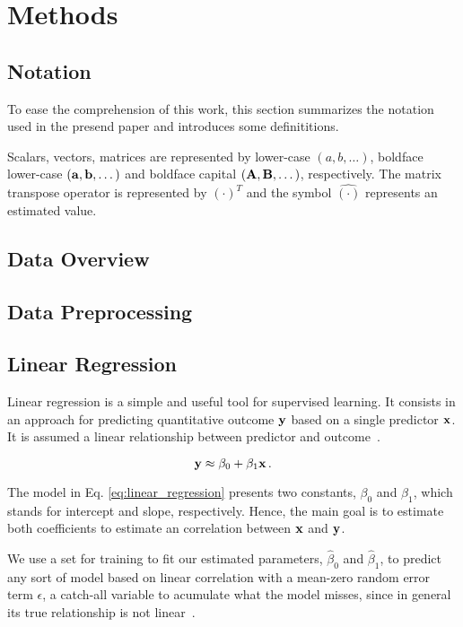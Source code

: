 \section{Methods}

\subsection{Notation}
To ease the comprehension of this work, this section summarizes the notation used in the presend paper and introduces some definititions.

Scalars, vectors, matrices are represented by lower-case $(a, b, \dots)$, boldface lower-case $({\bf a}, {\bf b}, \dots)$ and boldface capital $({\bf A}, {\bf B}, \dots)$, respectively. The matrix transpose operator is represented by $(\cdot)^T$ and the symbol $\hat{(\cdot)}$ represents an estimated value.

\subsection{Data Overview}

\subsection{Data Preprocessing}




\subsection{Linear Regression}
Linear regression is a simple and useful tool for supervised learning. It consists in an approach for predicting  quantitative outcome ${\bf y}$ based on a single predictor ${\bf x}$. It is assumed a linear relationship between predictor and outcome~\cite{James2013}.

\begin{equation}
{\bf y} \approx \beta_0 + \beta_1 {\bf x} \, . \label{eq:linear_regression}
\end{equation}

The model in Eq. \ref{eq:linear_regression} presents two constants, $\beta_0$ and $\beta_1$, which stands for intercept and slope, respectively. Hence, the main goal is to estimate both coefficients to estimate an correlation between ${\bf x}$ and ${\bf y}$.

We use a set for training to fit our estimated parameters, $\hat{\beta}_{0}$ and $\hat{\beta}_{1}$, to predict any sort of model based on linear correlation with a mean-zero random error term $\epsilon$, a catch-all variable to acumulate what the model misses, since in general its true relationship is not linear~\cite{James2013}.

